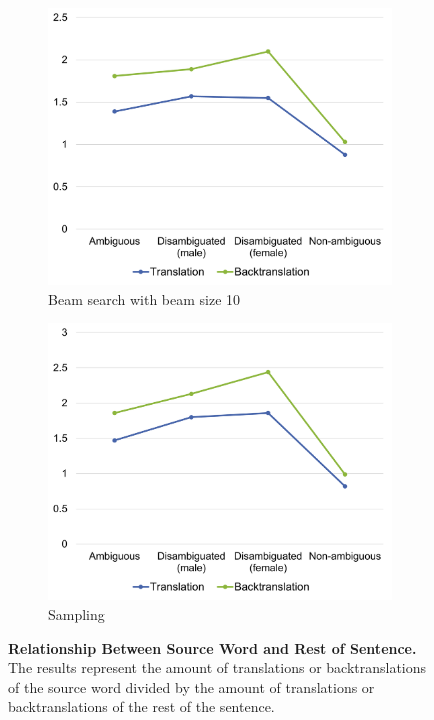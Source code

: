 \begin{figure}[!htb]
     \centering
     
     \begin{subfigure}{0.49\textwidth}
         \centering
         \includegraphics[width=\textwidth]{figures/correlation/words_beam10.png}
         \caption{Beam search with beam size 10}
         \label{fig:correlation_words_10}
     \end{subfigure}
     \hfill
     \begin{subfigure}{0.49\textwidth}
         \centering
         \includegraphics[width=\textwidth]{figures/correlation/words_sampling.png}
         \caption{Sampling}
         \label{fig:correlation_words_sampling}
     \end{subfigure}
     
    \caption[Relationship Between Source Word and Rest of Sentence]{\textbf{Relationship Between Source Word and Rest of Sentence.} The results represent the amount of translations or backtranslations of the source word divided by the amount of translations or backtranslations of the rest of the sentence.}
    \label{fig:correlation_words}

\end{figure}

